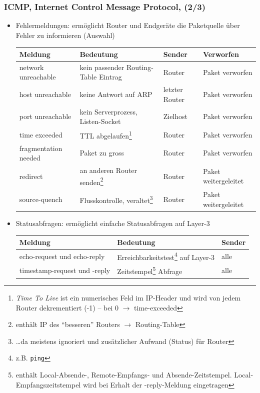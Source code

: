 \documentclass{beamer}
\begin{document}
\begin{frame}
\frametitle{ICMP, Internet Control Message Protocol, (2/3)}
\begin{itemize}
	\item{Fehlermeldungen: erm\"oglicht Router und Endger\"ate die Paketquelle \"uber Fehler zu informieren (Auswahl)\\   \begin{tiny}
	    \begin{tabular}{|l|l|l|l|}
	      \hline
	      \textbf{Meldung} & \textbf{Bedeutung} & \textbf{Sender} & Verworfen \\
	      \hline
	      network unreachable & kein passender Routing-Table Eintrag & Router & Paket verworfen \\
	      host unreachable & keine Antwort auf ARP & letzter Router & Paket verworfen \\
	      port unreachable & kein Serverprozess, Listen-Socket & Zielhost & Paket verworfen \\
	      time exceeded & TTL abgelaufen\footnote{{\em Time To Live} ist ein numerisches Feld im IP-Header und wird von jedem Router dekrementiert (-1) -- bei 0 $\rightarrow$ time-exceeded} & Router & Paket verworfen \\
	      fragmentation needed & Paket zu gross & Router & Paket verworfen \\
	      redirect & an anderen Router senden\footnote{enth\"alt IP des ``besseren'' Routers $\rightarrow$ Routing-Table} & Router & Paket weitergeleitet \\
	      source-quench & Flusskontrolle, veraltet\footnote{\ldots da meistens ignoriert und zus\"atzlicher Aufwand (Status) f\"ur Router} & Router & Paket weitergeleitet \\
	      \hline
	    \end{tabular}
	  \end{tiny}
	}
	\vspace{0.25cm}
	\item{Statusabfragen: erm\"oglicht einfache Statusabfragen auf Layer-3}\\    \begin{tiny}
	    \begin{tabular}{|l|l|l|}
	      \hline
	      \textbf{Meldung} & \textbf{Bedeutung} & \textbf{Sender} \\
	      \hline
				echo-request und echo-reply & Erreichbarkeitstest\footnote{z.B. \texttt{ping}} auf Layer-3 & alle \\
				timestamp-request und -reply & Zeitstempel\footnote{enth\"alt Local-Absende-, Remote-Empfangs- und Absende-Zeitstempel. Local-Empfangszeitstempel wird bei Erhalt der -reply-Meldung eingetragen} Abfrage & alle \\
	      \hline
	    \end{tabular}
	  \end{tiny}
\end{itemize}
\end{frame}
\end{document}
